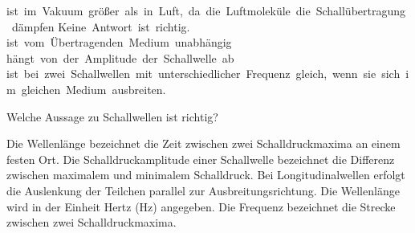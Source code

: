 \documentclass[11pt]{exam}
\begin{document}
\begin{questions}
\begin{choices}
	\choice ist im Vakuum größer als in Luft, da die Luftmoleküle die Schallübertragung dämpfen
	\choice Keine Antwort ist richtig.
	\choice ist vom Übertragenden Medium unabhängig
	\choice hängt von der Amplitude der Schallwelle ab
	\choice ist bei zwei Schallwellen mit unterschiedlicher Frequenz gleich, wenn sie sich im gleichen Medium ausbreiten.
\end{choices}

\vspace{3mm}\question Welche Aussage zu Schallwellen ist richtig?

\begin{choices}
	\choice Die Wellenlänge bezeichnet die Zeit zwischen zwei Schalldruckmaxima an einem festen Ort.
	\choice Die Schalldruckamplitude einer Schallwelle bezeichnet die Differenz zwischen maximalem und minimalem Schalldruck.
	\choice Bei Longitudinalwellen erfolgt die Auslenkung der Teilchen parallel zur Ausbreitungsrichtung.
	\choice Die Wellenlänge wird in der Einheit Hertz (Hz) angegeben.
	\choice Die Frequenz bezeichnet die Strecke zwischen zwei Schalldruckmaxima.
\end{choices}

\vspace{3mm}\end{questions}
\end{document}
